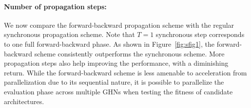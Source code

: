 \documentclass{article} %
\begin{document}
\vspace{-0.25cm}\paragraph{Number of propagation steps:}
We now compare  the forward-backward propagation scheme with the regular synchronous propagation
scheme. Note that $T=1$ synchronous step corresponds to one full forward-backward phase. As shown in
Figure~\ref{fig:sfig1},  the forward-backward scheme consistently outperforms the synchronous
scheme. More propagation steps also help improving the performance, with a diminishing return. While
the forward-backward scheme is less amenable to acceleration from parallelization due to its
sequential nature, it is possible to parallelize the evaluation phase across multiple GHNs when
testing the fitness of candidate architectures.
\end{document}
